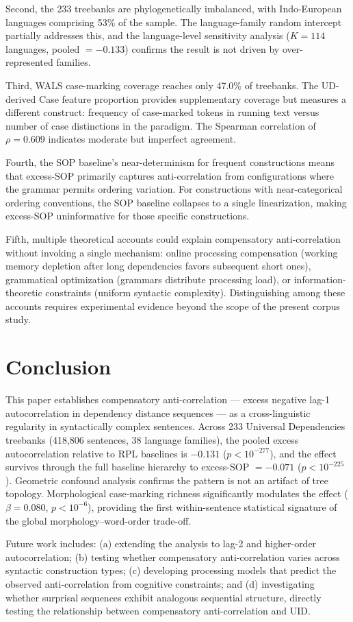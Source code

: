 \documentclass[11pt,letterpaper]{article}
\begin{document}
Second, the 233 treebanks are phylogenetically imbalanced, with Indo-European languages comprising 53\% of the sample. The language-family random intercept partially addresses this, and the language-level sensitivity analysis ($K = 114$ languages, pooled $= -0.133$) confirms the result is not driven by over-represented families.

Third, WALS case-marking coverage reaches only 47.0\% of treebanks. The UD-derived Case feature proportion provides supplementary coverage but measures a different construct: frequency of case-marked tokens in running text versus number of case distinctions in the paradigm. The Spearman correlation of $\rho = 0.609$ indicates moderate but imperfect agreement.

Fourth, the SOP baseline's near-determinism for frequent constructions means that excess-SOP primarily captures anti-correlation from configurations where the grammar permits ordering variation. For constructions with near-categorical ordering conventions, the SOP baseline collapses to a single linearization, making excess-SOP uninformative for those specific constructions.

Fifth, multiple theoretical accounts could explain compensatory anti-correlation without invoking a single mechanism: online processing compensation (working memory depletion after long dependencies favors subsequent short ones), grammatical optimization (grammars distribute processing load), or information-theoretic constraints (uniform syntactic complexity). Distinguishing among these accounts requires experimental evidence beyond the scope of the present corpus study.

\section{Conclusion}

This paper establishes compensatory anti-correlation --- excess negative lag-1 autocorrelation in dependency distance sequences --- as a cross-linguistic regularity in syntactically complex sentences. Across 233 Universal Dependencies treebanks (418,806 sentences, 38 language families), the pooled excess autocorrelation relative to RPL baselines is $-0.131$ ($p < 10^{-277}$), and the effect survives through the full baseline hierarchy to excess-SOP $= -0.071$ ($p < 10^{-225}$). Geometric confound analysis confirms the pattern is not an artifact of tree topology. Morphological case-marking richness significantly modulates the effect ($\beta = 0.080$, $p < 10^{-6}$), providing the first within-sentence statistical signature of the global morphology--word-order trade-off.

Future work includes: (a) extending the analysis to lag-2 and higher-order autocorrelation; (b) testing whether compensatory anti-correlation varies across syntactic construction types; (c) developing processing models that predict the observed anti-correlation from cognitive constraints; and (d) investigating whether surprisal sequences exhibit analogous sequential structure, directly testing the relationship between compensatory anti-correlation and UID.



\end{document}
